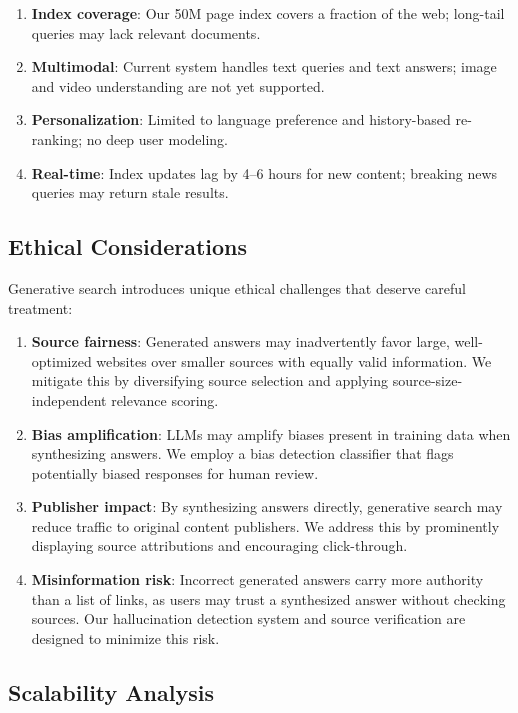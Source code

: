 \documentclass[11pt,twocolumn]{article}
\begin{document}
\begin{enumerate}[leftmargin=1.4em]
    \item \textbf{Index coverage}: Our 50M page index covers a fraction of the web; long-tail queries may lack relevant documents.
    \item \textbf{Multimodal}: Current system handles text queries and text answers; image and video understanding are not yet supported.
    \item \textbf{Personalization}: Limited to language preference and history-based re-ranking; no deep user modeling.
    \item \textbf{Real-time}: Index updates lag by 4--6 hours for new content; breaking news queries may return stale results.
\end{enumerate}

\subsection{Ethical Considerations}

Generative search introduces unique ethical challenges that deserve careful treatment:

\begin{enumerate}[leftmargin=1.4em]
    \item \textbf{Source fairness}: Generated answers may inadvertently favor large, well-optimized websites over smaller sources with equally valid information. We mitigate this by diversifying source selection and applying source-size-independent relevance scoring.
    \item \textbf{Bias amplification}: LLMs may amplify biases present in training data when synthesizing answers. We employ a bias detection classifier that flags potentially biased responses for human review.
    \item \textbf{Publisher impact}: By synthesizing answers directly, generative search may reduce traffic to original content publishers. We address this by prominently displaying source attributions and encouraging click-through.
    \item \textbf{Misinformation risk}: Incorrect generated answers carry more authority than a list of links, as users may trust a synthesized answer without checking sources. Our hallucination detection system and source verification are designed to minimize this risk.
\end{enumerate}

\subsection{Scalability Analysis}
\end{document}

